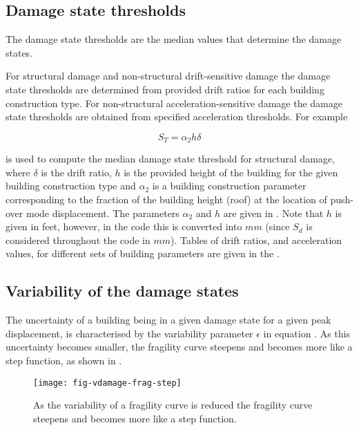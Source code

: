 \subsection{Damage state thresholds}

The damage state thresholds are the median values that determine the
damage states.

For structural damage and non-structural drift-sensitive damage
the damage state thresholds are determined from provided drift
ratios for each building construction type. For non-structural
acceleration-sensitive damage the damage state thresholds are
obtained from specified acceleration thresholds. For example

\begin{equation}
\label{eq:damage-dstate}
 S_T = \alpha_2 h\delta
\end{equation}

is used to compute the median damage state threshold for
structural damage, where $\delta$ is the drift ratio, $h$ is the
provided height of the building for the given building
construction type and $\alpha_2$ is a building construction
parameter corresponding to the fraction of the building height
(roof) at the location of push-over mode displacement. The
parameters $\alpha_2$ and $h$ are given in
. Note that $h$ is given in
feet, however, in the code this is converted into $mm$ (since
$S_d$ is considered throughout the code in $mm$). Tables of drift
ratios, and acceleration values, for different sets of building
parameters are given in the .


\subsection{Variability of the damage states}

The uncertainty of a building being in a given damage state for a
given peak displacement, is characterised
by the variability parameter $\epsilon$ in equation
. As this uncertainty becomes smaller, the
fragility curve steepens and becomes more
like a step function, as shown in .

\begin{figure}[htp]
\centering {}
\texttt{[image: fig-vdamage-frag-step]}
\caption{As the variability of a fragility curve is reduced the
  fragility curve steepens and becomes more like a step function.}
\label{fig:vdamage-frag-var}
\end{figure}



